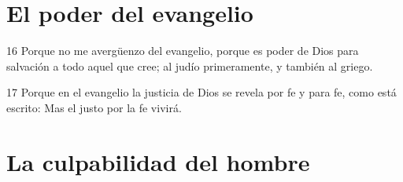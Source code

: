 \section*{El poder del evangelio}

\par 16 Porque no me avergüenzo del evangelio, porque es poder de Dios para salvación a todo aquel que cree; al judío primeramente, y también al griego.
\par 17 Porque en el evangelio la justicia de Dios se revela por fe y para fe, como está escrito: Mas el justo por la fe vivirá.

\section*{La culpabilidad del hombre}

